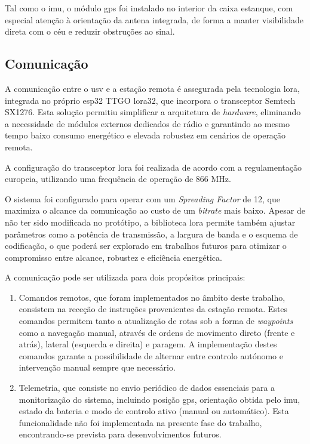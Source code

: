 Tal como o \gls{imu}, o módulo \gls{gps} foi instalado no interior da caixa estanque, com especial atenção à orientação da antena integrada, de forma a manter visibilidade direta com o céu e reduzir obstruções ao sinal.

\subsection{Comunicação}

A comunicação entre o \gls{usv} e a estação remota é assegurada pela tecnologia \acrfull{lora}, integrada no próprio \gls{esp32} TTGO \gls{lora}32, que incorpora o transceptor Semtech SX1276. Esta solução permitiu simplificar a arquitetura de \emph{hardware}, eliminando a necessidade de módulos externos dedicados de rádio e garantindo ao mesmo tempo baixo consumo energético e elevada robustez em cenários de operação remota.  

A configuração do transceptor \gls{lora} foi realizada de acordo com a regulamentação europeia, utilizando uma frequência de operação de 866 MHz. 

O sistema foi configurado para operar com um \emph{Spreading Factor} de 12, que maximiza o alcance da comunicação ao custo de um \emph{bitrate} mais baixo. Apesar de não ter sido modificada no protótipo, a biblioteca \gls{lora} permite também ajustar parâmetros como a potência de transmissão, a largura de banda e o esquema de codificação, o que poderá ser explorado em trabalhos futuros para otimizar o compromisso entre alcance, robustez e eficiência energética.  

A comunicação pode ser utilizada para dois propósitos principais:  

\begin{enumerate}
    \item Comandos remotos, que foram implementados no âmbito deste trabalho, consistem na receção de instruções provenientes da estação remota. Estes comandos permitem tanto a atualização de rotas sob a forma de \emph{waypoints} como a navegação manual, através de ordens de movimento direto (frente e atrás), lateral (esquerda e direita) e paragem. A implementação destes comandos garante a possibilidade de alternar entre controlo autónomo e intervenção manual sempre que necessário.  
    \item Telemetria, que consiste no envio periódico de dados essenciais para a monitorização do sistema, incluindo posição \gls{gps}, orientação obtida pelo \gls{imu}, estado da bateria e modo de controlo ativo (manual ou automático). Esta funcionalidade não foi implementada na presente fase do trabalho, encontrando-se prevista para desenvolvimentos futuros.  
\end{enumerate}

